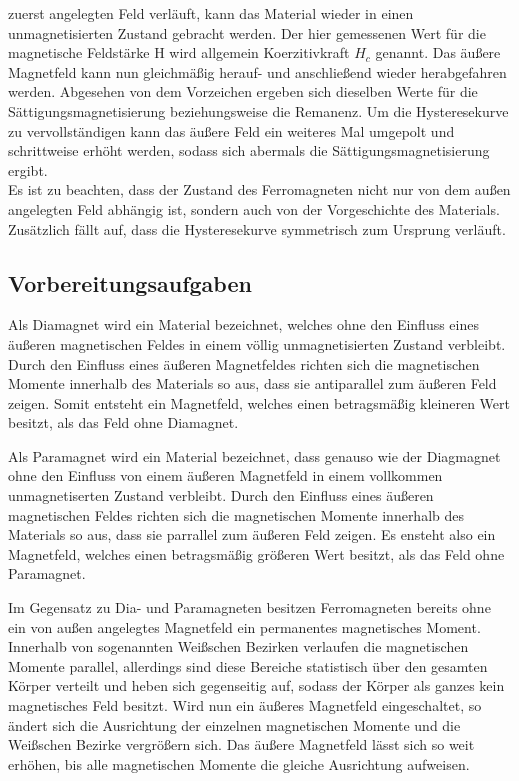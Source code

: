 zuerst angelegten Feld verläuft, kann das Material wieder in einen unmagnetisierten Zustand gebracht werden. Der hier gemessenen Wert 
für die magnetische Feldstärke H wird allgemein Koerzitivkraft $H_c$ genannt. Das äußere Magnetfeld kann nun gleichmäßig herauf- und anschließend wieder herabgefahren werden.
Abgesehen von dem Vorzeichen ergeben sich dieselben Werte für die Sättigungsmagnetisierung beziehungsweise die Remanenz. Um die Hysteresekurve
zu vervollständigen kann das äußere Feld ein weiteres Mal umgepolt und schrittweise erhöht werden, sodass sich abermals die Sättigungsmagnetisierung
ergibt. 
\\
Es ist zu beachten, dass der Zustand des Ferromagneten nicht nur von dem außen angelegten Feld abhängig ist, sondern auch
von der Vorgeschichte des Materials. Zusätzlich fällt auf, dass die Hysteresekurve symmetrisch zum Ursprung verläuft.


\subsection{Vorbereitungsaufgaben}
\label{sec:v}
Als Diamagnet wird ein Material bezeichnet, welches ohne den Einfluss eines 
äußeren magnetischen Feldes in einem völlig unmagnetisierten Zustand verbleibt.
Durch den Einfluss eines äußeren Magnetfeldes richten sich die magnetischen 
Momente innerhalb des Materials so aus, dass sie antiparallel zum äußeren 
Feld zeigen. Somit entsteht ein Magnetfeld, welches einen betragsmäßig kleineren 
Wert besitzt, als das Feld ohne Diamagnet.

Als Paramagnet wird ein Material bezeichnet, dass genauso wie der Diagmagnet 
ohne den Einfluss von einem äußeren Magnetfeld in einem vollkommen unmagnetiserten
Zustand verbleibt. Durch den Einfluss eines äußeren magnetischen Feldes richten 
sich die magnetischen Momente innerhalb des Materials so aus, dass sie parrallel 
zum äußeren Feld zeigen. Es ensteht also ein Magnetfeld, welches einen betragsmäßig 
größeren Wert besitzt, als das Feld ohne Paramagnet.

Im Gegensatz zu Dia- und Paramagneten besitzen Ferromagneten bereits ohne ein von außen angelegtes Magnetfeld
ein permanentes magnetisches Moment. Innerhalb von sogenannten Weißschen Bezirken verlaufen die magnetischen Momente
parallel, allerdings sind diese Bereiche statistisch über den gesamten Körper verteilt und heben sich gegenseitig auf,
sodass der Körper als ganzes kein magnetisches Feld besitzt. Wird nun ein äußeres Magnetfeld eingeschaltet, so ändert 
sich die Ausrichtung der einzelnen magnetischen Momente und die Weißschen Bezirke vergrößern sich. Das äußere Magnetfeld 
lässt sich so weit erhöhen, bis alle magnetischen Momente die gleiche Ausrichtung aufweisen. 
